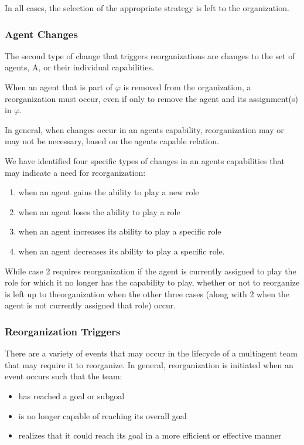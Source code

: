 In all cases, the selection of the appropriate strategy is left to the organization\cite{omacs2}.
\subsubsection{Agent Changes}
The second type of change that triggers reorganizations are changes to the set of agents, A, or their individual capabilities\cite{omacs2}.

When an agent that is part of $\varphi$ is removed from the organization, a reorganization must occur, even if only to remove the agent and its assignment(s) in $\varphi$.

In general, when changes occur in an agents capability, reorganization may or may not be necessary, based on the agents capable relation. 

We have identified four specific types of changes in an agents capabilities that may indicate a need for reorganization: 

\begin{enumerate}
\item 
	when an agent gains the ability to play a new role
\item
	when an agent loses the ability to play a role
\item
	when an agent increases its ability to play a specific role
\item
	when an agent decreases its ability to play a specific role.
\end{enumerate}	
 
While case 2 requires reorganization if the agent is currently assigned to play the role for which it no longer has the capability to play, whether or not to reorganize is left up to theorganization when the other three cases (along with 2 when the agent is not currently assigned that role) occur\cite{omacs2}.


\subsubsection{Reorganization Triggers}

There are a variety of events that may occur in the lifecycle of a multiagent team that may require it to reorganize. In
general, reorganization is initiated when an event occurs such that the team\cite{omacs1}:
\begin{itemize}
\newcommand{\localtextbulletone}{\textcolor{gray}{\raisebox{.45ex}{\rule{.6ex}{.6ex}}}}
\renewcommand{\labelitemi}{\localtextbulletone}
	\item has reached a goal or subgoal
	\item is no longer capable of reaching its overall goal
	\item realizes that it could reach its goal in a more efficient or effective manner
\end{itemize}
 

